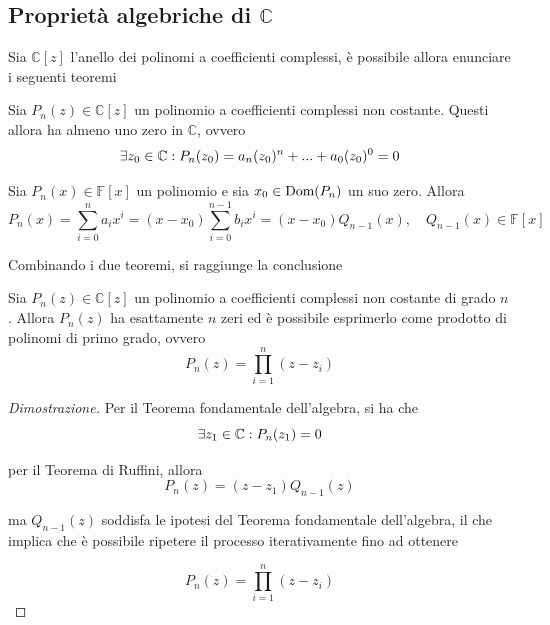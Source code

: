     \subsection{Proprietà algebriche di \texorpdfstring{$\mathbb{C}$}{C}}
        Sia $\mathbb{C}[z]$ l'anello dei polinomi a coefficienti complessi, è possibile allora enunciare i seguenti teoremi

        \begin{theorem}
            Sia $P_{n}(z) \in \mathbb{C}[z]$ un polinomio a coefficienti complessi non costante.
            Questi allora ha almeno uno zero in $\mathbb{C}$, ovvero
            \[
                \exists z_{0} \in \mathbb{C} \mathrel{:} P_{n}(z_{0}) = a_{n} (z_{0})^{n} + ... + a_{0} (z_{0})^{0} = 0
            \]
        \end{theorem}

        \begin{theorem}
            Sia $P_{n}(x) \in \mathbb{F}[x]$ un polinomio e sia $x_{0} \in \textnormal{Dom}(P_{n})$ un suo zero.
            Allora
            \[
                P_{n}(x) = \sum_{i = 0}^{n} a_{i} x^{i} = (x - x_{0}) \sum_{i = 0}^{n - 1} b_{i} x^{i} = (x - x_{0}) Q_{n - 1}(x), \quad Q_{n - 1}(x) \in \mathbb{F}[x]
            \]
        \end{theorem}

        Combinando i due teoremi, si raggiunge la conclusione

        \begin{corollary}
            Sia $P_{n}(z) \in \mathbb{C}[z]$ un polinomio a coefficienti complessi non costante di grado $n$.
            Allora $P_{n}(z)$ ha esattamente $n$ zeri ed è possibile esprimerlo come prodotto di polinomi di primo grado, ovvero
            \[
                P_{n}(z) = \prod_{i = 1}^{n} (z - z_{i})
            \]
        \end{corollary}

        \begin{proof}[Dimostrazione]
            Per il Teorema fondamentale dell'algebra, si ha che
            \[
                \exists z_{1} \in \mathbb{C} \mathrel{:} P_{n}(z_{1}) = 0
            \]

            per il Teorema di Ruffini, allora
            \[
                P_{n}(z) = (z - z_{1}) Q_{n - 1}(z)
            \]

            ma $Q_{n - 1}(z)$ soddisfa le ipotesi del Teorema fondamentale dell'algebra, il che implica che è possibile ripetere il processo iterativamente fino ad ottenere

            \[
                P_{n}(z) = \prod_{i = 1}^{n} (z - z_{i})
            \]
        \end{proof}




